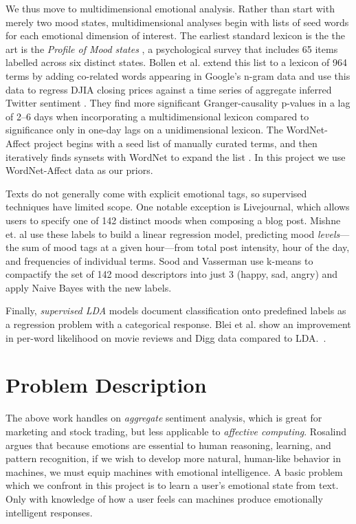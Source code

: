 \documentclass{article}
\begin{document}
We thus move to multidimensional emotional analysis. Rather than
start with merely two mood states, multidimensional analyses begin
with lists of seed words for each emotional dimension of interest.
The earliest standard lexicon is the the art is the \emph{Profile
of Mood states} \citep{mcnair71}, a psychological survey that
includes 65 items labelled across six distinct states. Bollen et
al. extend this list to a lexicon of 964 terms by adding co-related
words appearing in Google's n-gram data and use this data to regress
DJIA closing prices against a time series of aggregate inferred
Twitter sentiment \citep{bollen11}. They find more significant
Granger-causality p-values in a lag of 2--6 days when incorporating
a multidimensional lexicon compared to significance only in one-day
lags on a unidimensional lexicon. The WordNet-Affect project begins
with a seed list of manually curated terms, and then iteratively
finds synsets with WordNet to expand the list \citep{strapparava04}.
In this project we use WordNet-Affect data as our priors.

Texts do not generally come with explicit emotional tags, so
supervised techniques have limited scope. One notable exception is
Livejournal, which allows users to specify one of 142 distinct moods
when composing a blog post. Mishne et. al \citep{mishne06} use these
labels to build a linear regression model, predicting mood
\emph{levels}---the sum of mood tags at a given hour---from total
post intensity, hour of the day, and frequencies of individual
terms. Sood and Vasserman use k-means to compactify the set of 142
mood descriptors into just 3 (happy, sad, angry) and apply Naive Bayes
with the new labels.

Finally, \emph{supervised LDA} models document classification onto
predefined labels as a regression problem with a categorical response.
Blei et al. show an improvement in per-word likelihood on movie reviews
and Digg data compared to LDA.~\citep{blei07}.

\section{Problem Description}
The above work handles on \emph{aggregate} sentiment analysis, which
is great for marketing and stock trading, but less applicable to
\emph{affective computing}. Rosalind~\citep{picard97} argues that because emotions
are essential to human reasoning, learning, and pattern recognition,
if we wish to develop more natural, human-like behavior in machines,
we must equip machines with emotional intelligence.
A basic problem which we confront in this project is to learn a
user's emotional state from text. Only with knowledge of how a user
feels can machines produce emotionally intelligent responses.
\end{document}
